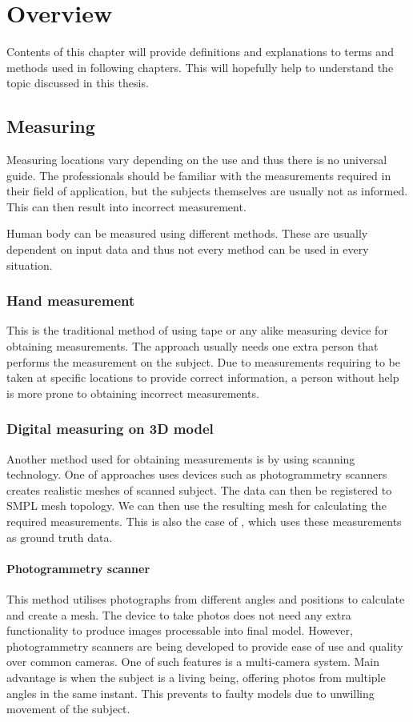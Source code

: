 \chapter{Overview}

Contents of this chapter will provide definitions and explanations to terms and methods used in following chapters. This will hopefully help to understand the topic discussed in this thesis.


\section{Measuring}
Measuring locations vary depending on the use and thus there is no universal guide. The professionals should be familiar with the measurements required in their field of application, but the subjects themselves are usually not as informed. This can then result into incorrect measurement.

Human body can be measured using different methods. These are usually dependent on input data and thus not every method can be used in every situation.  

\subsection{Hand measurement}
This is the traditional method of using tape or any alike measuring device for obtaining measurements. The approach usually needs one extra person that performs the measurement on the subject. Due to measurements requiring to be taken at specific locations to provide correct information, a person without help is more prone to obtaining incorrect measurements.


\subsection{Digital measuring on 3D model}
Another method used for obtaining measurements is by using scanning technology. One of approaches uses devices such as photogrammetry scanners creates realistic meshes of scanned subject. The data can then be registered to SMPL \cite{smpl} mesh topology. We can then use the resulting mesh for calculating the required measurements. This is also the case of \cite{BodyM}, which uses these measurements as ground truth data.
\subsubsection{Photogrammetry scanner}
This method utilises photographs from different angles and positions to calculate and create a mesh. The device to take photos does not need any extra functionality to produce images processable into final model. However, photogrammetry scanners are being developed to provide ease of use and quality over common cameras. One of such features is a multi-camera system. Main advantage is when the subject is a living being, offering photos from multiple angles in the same instant. This prevents to faulty models due to unwilling movement of the subject.
\\

